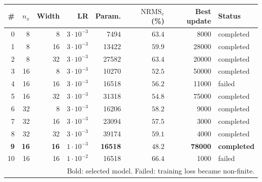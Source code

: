 \footnotesize
\setlength{\tabcolsep}{2.8pt}
\begin{tabular}{r r r r r r r l}
\toprule
\# & $n_x$ & Width & LR & Param. & $\mathrm{NRMS}_e$ (\%) & Best update & Status\\
\midrule
0 & 8 & 8 & $3\cdot10^{-3}$ & 7494 & $63.4$ & 8000 & completed\\
1 & 8 & 16 & $3\cdot10^{-3}$ & 13422 & $59.9$ & 28000 & completed\\
2 & 8 & 32 & $3\cdot10^{-3}$ & 27582 & $63.4$ & 20000 & completed\\
3 & 16 & 8 & $3\cdot10^{-3}$ & 10270 & $52.5$ & 50000 & completed\\
4 & 16 & 16 & $3\cdot10^{-3}$ & 16518 & $56.2$ & 11000 & failed\\
5 & 16 & 32 & $3\cdot10^{-3}$ & 31318 & $54.8$ & 75000 & completed\\
6 & 32 & 8 & $3\cdot10^{-3}$ & 16206 & $58.2$ & 9000 & completed\\
7 & 32 & 16 & $3\cdot10^{-3}$ & 23094 & $57.5$ & 3000 & completed\\
8 & 32 & 32 & $3\cdot10^{-3}$ & 39174 & $59.1$ & 4000 & completed\\
\textbf{9} & \textbf{16} & \textbf{16} & \textbf{$1\cdot10^{-3}$} & \textbf{16518} & \textbf{$48.2$} & \textbf{78000} & \textbf{completed}\\
10 & 16 & 16 & $1\cdot10^{-2}$ & 16518 & $66.4$ & 1000 & failed\\
\bottomrule
\multicolumn{8}{p{0.9\columnwidth}}{Bold: selected model. Failed: training loss became non-finite.}\\
\end{tabular}
